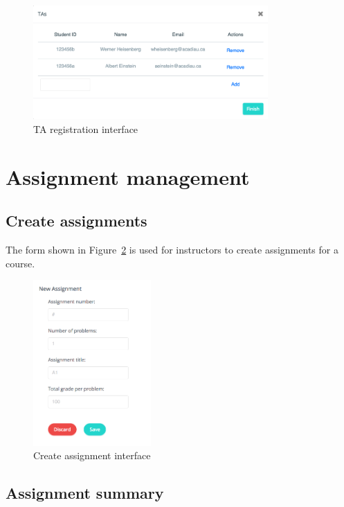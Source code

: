 \begin{figure}[H]
    \centering
        \includegraphics[width=0.8\textwidth]{figures/reg-ta}
    \caption{TA registration interface}
    \label{fig:REG_TA}
\end{figure}


\section{Assignment management}

\subsection{Create assignments}
The form shown in Figure~\ref{fig:NEW_ASM} is used for instructors to create
assignments for a course.

\begin{figure}[H]
    \centering
        \includegraphics[width=0.4\textwidth]{figures/create-asm}
    \caption{Create assignment interface}
    \label{fig:NEW_ASM}
\end{figure}

\subsection{Assignment summary}

